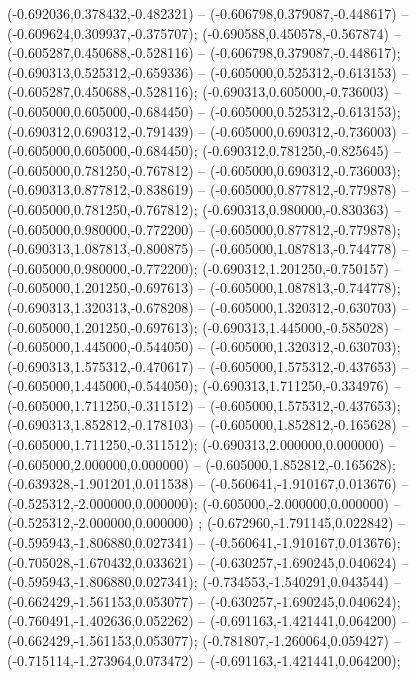  (-0.692036,0.378432,-0.482321) -- (-0.606798,0.379087,-0.448617) -- (-0.609624,0.309937,-0.375707);
 (-0.690588,0.450578,-0.567874) -- (-0.605287,0.450688,-0.528116) -- (-0.606798,0.379087,-0.448617);
 (-0.690313,0.525312,-0.659336) -- (-0.605000,0.525312,-0.613153) -- (-0.605287,0.450688,-0.528116);
 (-0.690313,0.605000,-0.736003) -- (-0.605000,0.605000,-0.684450) -- (-0.605000,0.525312,-0.613153);
 (-0.690312,0.690312,-0.791439) -- (-0.605000,0.690312,-0.736003) -- (-0.605000,0.605000,-0.684450);
 (-0.690312,0.781250,-0.825645) -- (-0.605000,0.781250,-0.767812) -- (-0.605000,0.690312,-0.736003);
 (-0.690313,0.877812,-0.838619) -- (-0.605000,0.877812,-0.779878) -- (-0.605000,0.781250,-0.767812);
 (-0.690313,0.980000,-0.830363) -- (-0.605000,0.980000,-0.772200) -- (-0.605000,0.877812,-0.779878);
 (-0.690313,1.087813,-0.800875) -- (-0.605000,1.087813,-0.744778) -- (-0.605000,0.980000,-0.772200);
 (-0.690312,1.201250,-0.750157) -- (-0.605000,1.201250,-0.697613) -- (-0.605000,1.087813,-0.744778);
 (-0.690313,1.320313,-0.678208) -- (-0.605000,1.320312,-0.630703) -- (-0.605000,1.201250,-0.697613);
 (-0.690313,1.445000,-0.585028) -- (-0.605000,1.445000,-0.544050) -- (-0.605000,1.320312,-0.630703);
 (-0.690313,1.575312,-0.470617) -- (-0.605000,1.575312,-0.437653) -- (-0.605000,1.445000,-0.544050);
 (-0.690313,1.711250,-0.334976) -- (-0.605000,1.711250,-0.311512) -- (-0.605000,1.575312,-0.437653);
 (-0.690313,1.852812,-0.178103) -- (-0.605000,1.852812,-0.165628) -- (-0.605000,1.711250,-0.311512);
 (-0.690313,2.000000,0.000000) -- (-0.605000,2.000000,0.000000) -- (-0.605000,1.852812,-0.165628);
 (-0.639328,-1.901201,0.011538) -- (-0.560641,-1.910167,0.013676) -- (-0.525312,-2.000000,0.000000);
 (-0.605000,-2.000000,0.000000) -- (-0.525312,-2.000000,0.000000) ;
 (-0.672960,-1.791145,0.022842) -- (-0.595943,-1.806880,0.027341) -- (-0.560641,-1.910167,0.013676);
 (-0.705028,-1.670432,0.033621) -- (-0.630257,-1.690245,0.040624) -- (-0.595943,-1.806880,0.027341);
 (-0.734553,-1.540291,0.043544) -- (-0.662429,-1.561153,0.053077) -- (-0.630257,-1.690245,0.040624);
 (-0.760491,-1.402636,0.052262) -- (-0.691163,-1.421441,0.064200) -- (-0.662429,-1.561153,0.053077);
 (-0.781807,-1.260064,0.059427) -- (-0.715114,-1.273964,0.073472) -- (-0.691163,-1.421441,0.064200);
